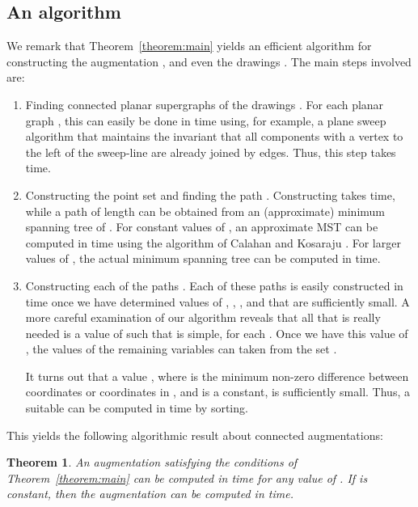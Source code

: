 \documentclass[11pt]{patmorin}
\newtheorem{theorem}{Theorem}[section]
\begin{document}
\subsection{An algorithm}


We remark that Theorem~\ref{theorem:main} yields an efficient algorithm for constructing the augmentation , and even the drawings .  The main steps involved are: 

\begin{enumerate}
  \item Finding connected planar supergraphs 
  of the drawings .  For each planar graph , this
  can easily be done in  time using, for example, a plane
  sweep algorithm that maintains the invariant that all components with
  a vertex to the left of the sweep-line are already joined by edges.
  Thus, this step takes  time.

  \item Constructing the point set  and finding the path
  .  Constructing  takes  time, while a path  of length
   can be obtained from an (approximate) minimum spanning
  tree of .  For constant values of , an approximate MST can
  be computed in  time using the algorithm of Calahan and
  Kosaraju \cite{callahan.kosaraju:faster}.  For larger values of ,
  the actual minimum spanning tree can be computed in  time.

  \item Constructing each of the paths .
  Each of these paths is easily constructed in  time
  once we have determined values of , , , and
   that are sufficiently small.  A more careful examination
  of our algorithm reveals that all that is really needed is
  a value of  such that  is
  simple, for each .  Once we have this value of
  , the values of the remaining variables can taken from
  the set .

  It turns out that a value , where  is the
  minimum non-zero difference between  coordinates or  coordinates
  in , and  is a constant, is sufficiently small.
  Thus, a suitable  can be computed in  time
  by sorting.
\end{enumerate}

This yields the following algorithmic result about connected augmentations:

\begin{theorem}
  An augmentation satisfying the conditions of Theorem~\ref{theorem:main}
  can be computed in  time for any value of .  If  is
  constant, then the augmentation can be computed in 
  time.
\end{theorem}
\end{document}
